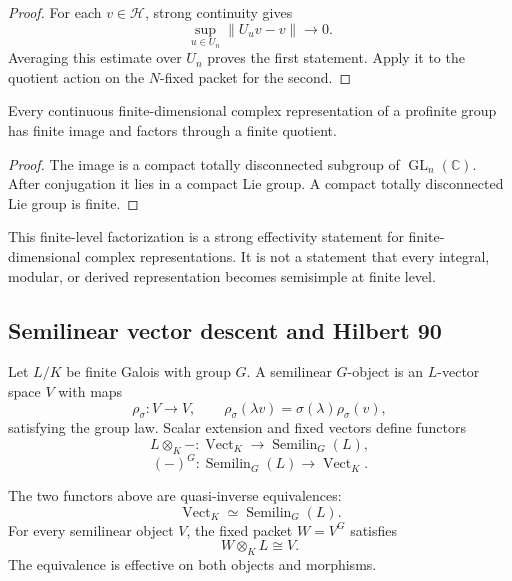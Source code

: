\begin{proof}
For each \(v\in\mathcal H\), strong continuity gives
\[
 \sup_{u\in U_n}\|U_uv-v\|\longrightarrow0.
\]
Averaging this estimate over \(U_n\) proves the first statement.  Apply it to the quotient action on the \(N\)-fixed packet for the second.
\end{proof}

\begin{corollary}
\label{cor:block12-finite-level}
Every continuous finite-dimensional complex representation of a profinite group has finite image and factors through a finite quotient.
\end{corollary}

\begin{proof}
The image is a compact totally disconnected subgroup of \(\operatorname{GL}_n(\mathbb C)\).  After conjugation it lies in a compact Lie group.  A compact totally disconnected Lie group is finite.
\end{proof}

This finite-level factorization is a strong effectivity statement for finite-dimensional complex representations.  It is not a statement that every integral, modular, or derived representation becomes semisimple at finite level.

\subsection{Semilinear vector descent and Hilbert 90}
\label{subsec:block12-hilbert90}

Let \(L/K\) be finite Galois with group \(G\).  A semilinear \(G\)-object is an \(L\)-vector space \(V\) with maps
\[
 \rho_\sigma:V\to V,
 \qquad
 \rho_\sigma(\lambda v)=\sigma(\lambda)\rho_\sigma(v),
\]
satisfying the group law.  Scalar extension and fixed vectors define functors
\[
 L\otimes_K-:\operatorname{Vect}_K\longrightarrow\operatorname{Semilin}_G(L),
\]
\[
 (-)^G:\operatorname{Semilin}_G(L)\longrightarrow\operatorname{Vect}_K.
\]

\begin{theorem}
\label{thm:block12-vector-descent}
The two functors above are quasi-inverse equivalences:
\[
 \boxed{
 \operatorname{Vect}_K
 \simeq
 \operatorname{Semilin}_G(L).}
 \tag{12.16}
\]
For every semilinear object \(V\), the fixed packet \(W=V^G\) satisfies
\[
 \boxed{W\otimes_KL\cong V.}
 \tag{12.17}
\]
The equivalence is effective on both objects and morphisms.
\end{theorem}

